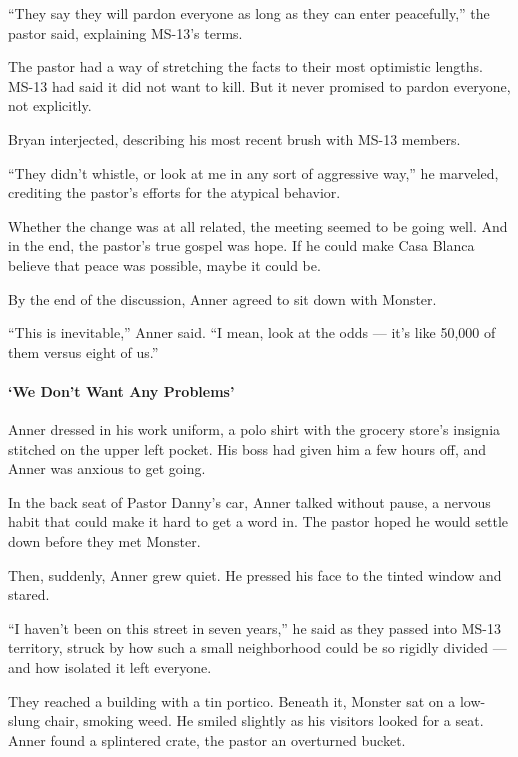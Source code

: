 ``They say they will pardon everyone as long as they can enter
peacefully,'' the pastor said, explaining MS-13's terms.

The pastor had a way of stretching the facts to their most optimistic
lengths. MS-13 had said it did not want to kill. But it never promised
to pardon everyone, not explicitly.

Bryan interjected, describing his most recent brush with MS-13 members.

``They didn't whistle, or look at me in any sort of aggressive way,'' he
marveled, crediting the pastor's efforts for the atypical behavior.

Whether the change was at all related, the meeting seemed to be going
well. And in the end, the pastor's true gospel was hope. If he could
make Casa Blanca believe that peace was possible, maybe it could be.

By the end of the discussion, Anner agreed to sit down with Monster.

``This is inevitable,'' Anner said. ``I mean, look at the odds --- it's
like 50,000 of them versus eight of us.''

\hypertarget{we-dont-want-any-problems}{%
\paragraph{`We Don't Want Any
Problems'}\label{we-dont-want-any-problems}}

Anner dressed in his work uniform, a polo shirt with the grocery store's
insignia stitched on the upper left pocket. His boss had given him a few
hours off, and Anner was anxious to get going.

In the back seat of Pastor Danny's car, Anner talked without pause, a
nervous habit that could make it hard to get a word in. The pastor hoped
he would settle down before they met Monster.

Then, suddenly, Anner grew quiet. He pressed his face to the tinted
window and stared.

``I haven't been on this street in seven years,'' he said as they passed
into MS-13 territory, struck by how such a small neighborhood could be
so rigidly divided --- and how isolated it left everyone.

They reached a building with a tin portico. Beneath it, Monster sat on a
low-slung chair, smoking weed. He smiled slightly as his visitors looked
for a seat. Anner found a splintered crate, the pastor an overturned
bucket.

